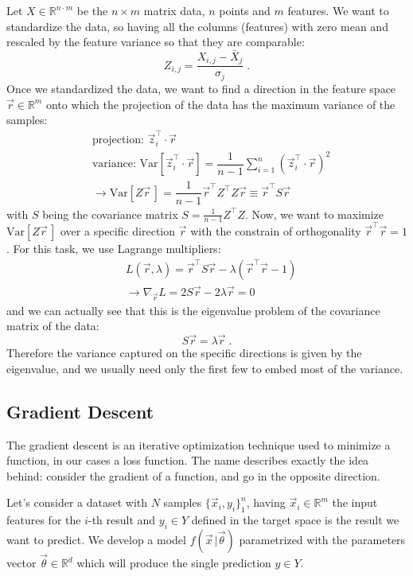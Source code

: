 \documentclass[12pt,a4paper]{article}
\begin{document}
Let $X\in \mathbb{R}^{n\cdot m}$ be the $n\times m$ matrix data, $n$ points and $m$ features. We want to standardize the data, so having all the columns (features) with zero mean and rescaled by the feature variance so that they are comparable:
\begin{equation*}
	Z_{i,j} = \dfrac{X_{i,j} - \bar{X}_j}{\sigma_j}\;.
\end{equation*} 
Once we standardized the data, we want to find a direction in the feature space $\vec{r}\in \mathbb{R}^m$ onto which the projection of the data has the maximum variance of the samples:
\begin{align*}
	&\text{projection: } \vec{z}_i^\top \cdot \vec{r} \\
	&\text{variance: } \text{Var} [\vec{z}^\top_i\cdot \vec{r}] = \dfrac{1}{n-1} \sum_{i=1}^n \left(\vec{z}_i^\top \cdot \vec{r}\right)^2\\
	&\rightarrow \text{Var}\left[Z \vec{r}\,\right] = \dfrac{1}{n-1} \vec{r}^\top Z^\top Z \vec{r} \equiv \vec{r}^\top S \vec{r}
\end{align*}
with $S$ being the covariance matrix $S=\frac{1}{n-1} Z^\top Z$. Now, we want to maximize $\text{Var}\left[Z \vec{r}\,\right]$ over a specific direction $\vec{r}$ with the constrain of orthogonality $\vec{r}^\top \vec{r}=1$. For this task, we use Lagrange multipliers:
\begin{align*}
	&L(\vec{r},\lambda) = \vec{r}^\top S \vec{r} - \lambda (\vec{r}^\top \vec{r}-1) \\
	&\rightarrow \nabla_{\vec{r}} L = 2S\vec{r} - 2\lambda \vec{r} = 0
\end{align*}
and we can actually see that this is the eigenvalue problem of the covariance matrix of the data:
\begin{equation*}
	S\vec{r} = \lambda \vec{r}\;.
\end{equation*}
Therefore the variance captured on the specific directions is given by the eigenvalue, and we usually need only the first few to embed most of the variance.

\subsection{Gradient Descent}
The gradient descent is an iterative optimization technique used to minimize a function, in our cases a loss function. The name describes exactly the idea behind: consider the gradient of a function, and go in the opposite direction.

Let's consider a dataset with $N$ samples $\{\vec{x}_i, y_i\}_1^n$, having $\vec{x}_i\in \mathbb{R}^m$ the input features for the $i$-th result and $y_i\in Y$ defined in the target space is the result we want to predict.
We develop a model $f(\vec{x}\, | \vec{\theta})$ parametrized with the parameters vector $\vec{\theta}\in \mathbb{R}^d$ which will produce the single prediction $y\in Y$.
\end{document}

